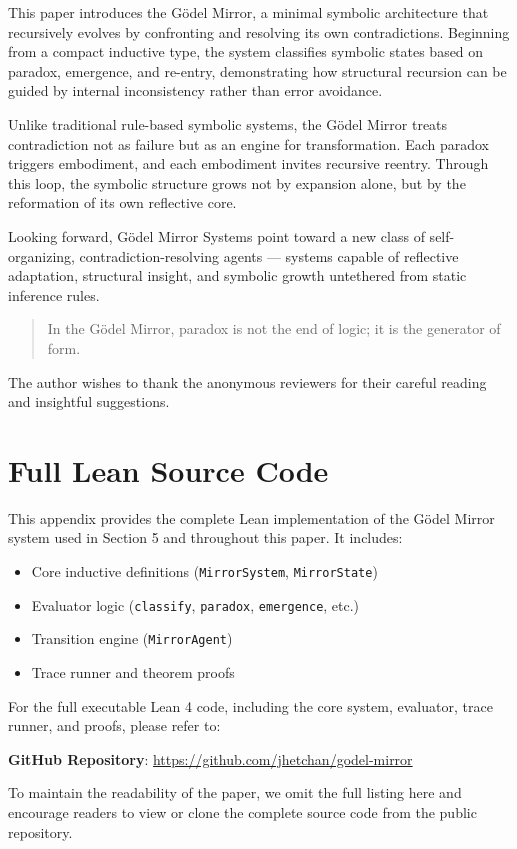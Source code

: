 \documentclass[manuscript,nonacm]{acmart}
\begin{document}
This paper introduces the Gödel Mirror, a minimal symbolic architecture that recursively evolves by confronting and resolving its own contradictions. Beginning from a compact inductive type, the system classifies symbolic states based on paradox, emergence, and re-entry, demonstrating how structural recursion can be guided by internal inconsistency rather than error avoidance.

Unlike traditional rule-based symbolic systems, the Gödel Mirror treats contradiction not as failure but as an engine for transformation. Each paradox triggers embodiment, and each embodiment invites recursive reentry. Through this loop, the symbolic structure grows not by expansion alone, but by the reformation of its own reflective core.

Looking forward, Gödel Mirror Systems point toward a new class of self-organizing, contradiction-resolving agents — systems capable of reflective adaptation, structural insight, and symbolic growth untethered from static inference rules.

\begin{quote}
In the Gödel Mirror, paradox is not the end of logic; it is the generator of form.
\end{quote}

\begin{acks}
The author wishes to thank the anonymous reviewers for their careful reading and insightful suggestions.
\end{acks}




\appendix

\section{Full Lean Source Code}

This appendix provides the complete Lean implementation of the Gödel Mirror system used in Section 5 and throughout this paper. It includes:

\begin{itemize}
\item Core inductive definitions (\texttt{MirrorSystem}, \texttt{MirrorState})
\item Evaluator logic (\texttt{classify}, \texttt{paradox}, \texttt{emergence}, etc.)
\item Transition engine (\texttt{MirrorAgent})
\item Trace runner and theorem proofs
\end{itemize}

For the full executable Lean 4 code, including the core system, evaluator, trace runner, and proofs, please refer to:

\textbf{GitHub Repository}: \href{https://github.com/jhetchan/godel-mirror}{https://github.com/jhetchan/godel-mirror}

To maintain the readability of the paper, we omit the full listing here and encourage readers to view or clone the complete source code from the public repository.
\end{document}
